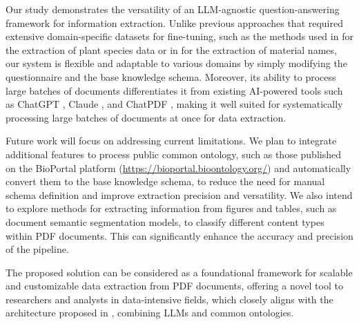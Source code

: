 \documentclass{article}
\begin{document}
\par 
Our study demonstrates the versatility of an LLM-agnostic question-answering framework for information extraction. 
Unlike previous approaches that required extensive domain-specific datasets for fine-tuning, such as the methods 
used in \citep{2022.VA.ATE} for the extraction of plant species data or in \citep{2022.TA.MAM} 
for the extraction of material names, our system is flexible and adaptable to various domains by simply modifying the 
questionnaire and the base knowledge schema. 
Moreover, its ability to process large batches of documents differentiates it from existing AI-powered tools such as 
ChatGPT \citep{2024.OP.GTR}, Claude \citep{2024.LO.C2L}, and ChatPDF \citep{2024.AS.RDS}, 
making it well suited for systematically processing large batches of documents at once for data extraction.
\par 
Future work will focus on addressing current limitations. We plan to integrate additional features to process 
public common ontology, such as those published on the BioPortal platform (\url{https://bioportal.bioontology.org/}) 
and automatically convert them to the base knowledge schema, to reduce the need for manual schema definition and 
improve extraction precision and versatility. 
We also intend to explore methods for extracting information from figures and tables, such as document semantic 
segmentation models, to classify different content types within PDF documents. 
This can significantly enhance the accuracy and precision of the pipeline.
\par 
The proposed solution can be considered as a foundational framework for scalable and customizable data extraction 
from PDF documents, offering a novel tool to researchers and analysts in data-intensive fields, which closely aligns 
with the architecture proposed in \citep{2025.SD.ARO}, combining LLMs and common ontologies.
\end{document}
